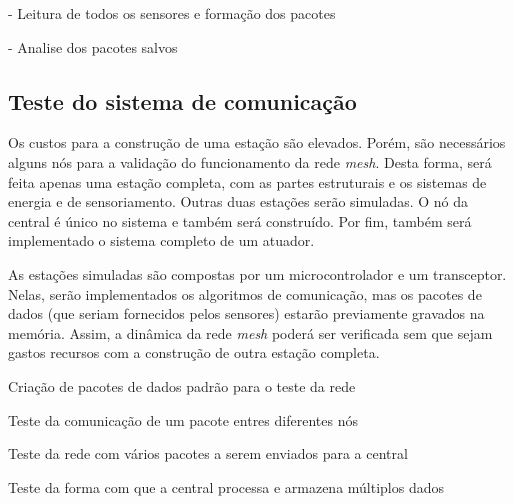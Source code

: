 			- Leitura de todos os sensores e formação dos pacotes
			
			- Analise dos pacotes salvos
	
	\subsection{Teste do sistema de comunicação}
	
		Os custos para a construção de uma estação são elevados. Porém, são necessários alguns nós para a validação do funcionamento da rede \emph{mesh}. Desta forma, será feita apenas uma estação completa, com as partes estruturais e os sistemas de energia e de sensoriamento. Outras duas estações serão simuladas. O nó da central é único no sistema e também será construído. Por fim, também será implementado o sistema completo de um atuador. 
	
		As estações simuladas são compostas por um microcontrolador e um transceptor. Nelas, serão implementados os algoritmos de comunicação, mas os pacotes de dados (que seriam fornecidos pelos sensores) estarão previamente gravados na memória. Assim, a dinâmica da rede \emph{mesh} poderá ser verificada sem que sejam gastos recursos com a construção de outra estação completa.  
				
		Criação de pacotes de dados padrão para o teste da rede
		
		Teste da comunicação de um pacote entres diferentes nós 

		Teste da rede com vários pacotes a serem enviados para a central
		
		Teste da forma com que a central processa e armazena múltiplos dados
		
		
